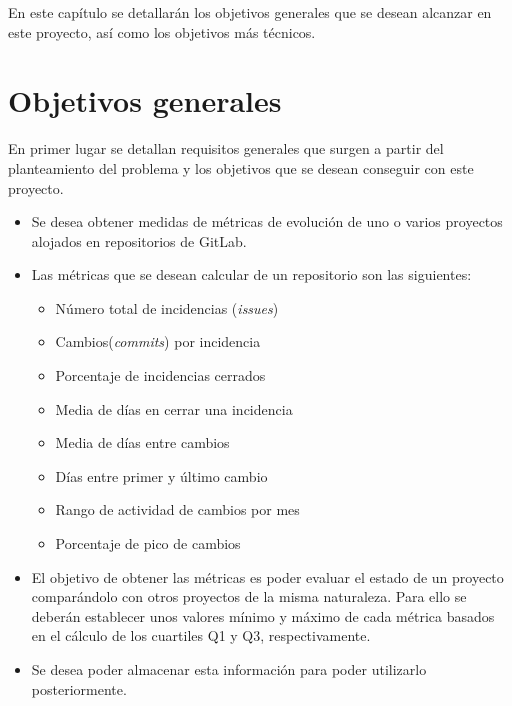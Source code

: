 
En este capítulo se detallarán los objetivos generales que se desean alcanzar en este proyecto, así como los objetivos más técnicos.

\section{Objetivos generales}
En primer lugar se detallan requisitos generales que surgen a partir del planteamiento del problema y los objetivos que se desean conseguir con este proyecto.
\begin{itemize}
	\tightlist
	\item Se desea obtener medidas de métricas de evolución de uno o varios proyectos alojados en repositorios de GitLab.
	\item Las métricas que se desean calcular de un repositorio son las siguientes:
	\begin{itemize}
		\tightlist
		\item Número total de incidencias (\textit{issues})
		\item Cambios(\textit{commits}) por incidencia
		\item Porcentaje de incidencias cerrados
		\item Media de días en cerrar una incidencia
		\item Media de días entre cambios
		\item Días entre primer y último cambio
		\item Rango de actividad de cambios por mes
		\item Porcentaje de pico de cambios
	\end{itemize}
	\item El objetivo de obtener las métricas es poder evaluar el estado de un proyecto comparándolo con otros proyectos de la misma naturaleza. Para ello se deberán establecer unos valores mínimo y máximo de cada métrica basados en el cálculo de los cuartiles Q1 y Q3, respectivamente.
	\item Se desea poder almacenar esta información para poder utilizarlo posteriormente.
\end{itemize}
